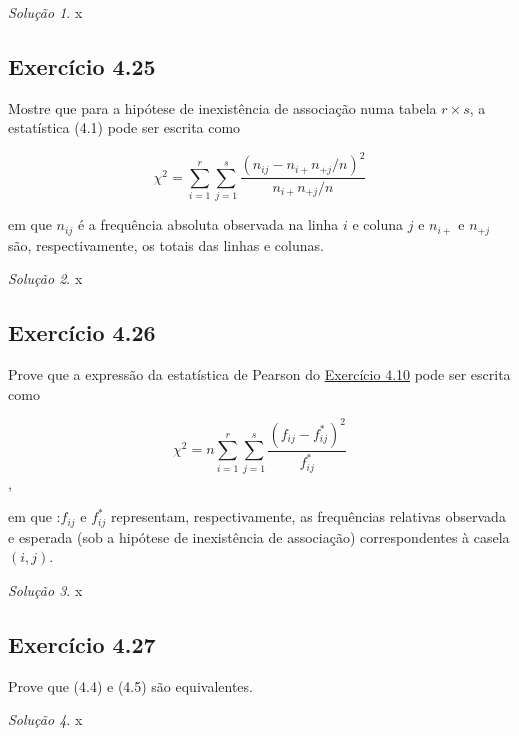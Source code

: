 \documentclass[
]{latex/krantz}
\theoremstyle{definition}
\theoremstyle{definition}
\theoremstyle{definition}
\theoremstyle{definition}
\theoremstyle{remark}
\newtheorem*{solution}{Solução}
\begin{document}
\begin{solution}
x
\end{solution}

\hypertarget{exr4-25}{%
\subsection*{Exercício 4.25}\label{exr4-25}}

Mostre que para a hipótese de inexistência de associação numa tabela \(r \times s\), a estatística (4.1) pode ser escrita como

\[\chi^{2}=\sum_{i=1}^{r}\sum_{j=1}^{s}\frac{(n_{ij}-n_{i+}n_{+j}/n)^{2}}{n_{i+}n_{+j}/n}\]

em que \(n_{ij}\) é a frequência absoluta observada na linha \(i\) e coluna \(j\) e \(n_{i+}\) e \(n_{+j}\) são, respectivamente, os totais das linhas e colunas.

\begin{solution}
x
\end{solution}

\hypertarget{exr4-26}{%
\subsection*{Exercício 4.26}\label{exr4-26}}

Prove que a expressão da estatística de Pearson do \protect\hyperlink{exr4-10}{Exercício 4.10} pode ser escrita como

\[\chi^{2}=n\sum_{i=1}^{r}\sum_{j=1}^{s}\frac{(f_{ij}-f_{ij}^{*})^{2}}{f_{ij}^{*}}\],

em que :\(f_{ij}\) e \(f^{*}_{ij}\) representam, respectivamente, as frequências relativas observada e esperada (sob a hipótese de inexistência de associação) correspondentes à casela \((i, j)\).

\begin{solution}
x
\end{solution}

\hypertarget{exr4-27}{%
\subsection*{Exercício 4.27}\label{exr4-27}}

Prove que (4.4) e (4.5) são equivalentes.

\begin{solution}
x
\end{solution}
\end{document}
